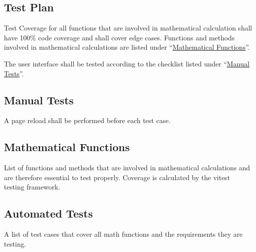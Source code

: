 \subsection{Test Plan}
Test Coverage for all functions that are involved in mathematical calculation shall have 100\% code coverage and shall cover edge cases. Functions and methods involved in mathematical calculations are listed under \enquote{\hyperref[tab:math_functions]{Mathematical Functions}}.

The user interface shall be tested according to the checklist listed under \enquote{\hyperref[tab:manual_tests]{Manual Tests}}. 

\subsection{Manual Tests}
A page reload shall be performed before each test case.


\newpage
\subsection{Mathematical Functions}

List of functions and methods that are involved in mathematical calculations and are therefore essential to test properly. Coverage is calculated by the {\ttfamily vitest} testing framework.

    
\subsection{Automated Tests}
A list of test cases that cover all math functions and the requirements they are testing.
